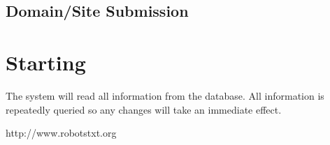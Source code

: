 \documentclass[a4paper,12pt]{article}
\begin{document}
\subsection{Domain/Site Submission}

\section{Starting}

The system will read all information from the database.  All information is repeatedly queried
so any changes will take an immediate effect.

\begin{thebibliography}{9}
     http://www.robotstxt.org
\end{thebibliography}
\end{document}
